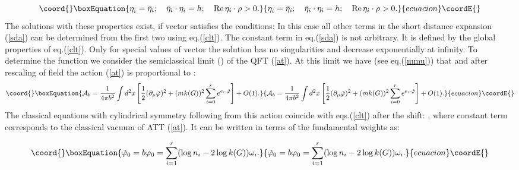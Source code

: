 \documentclass[a4paper,12pt]{article}
\begin{document}
\begin{equation}\coord{}\boxEquation{
\eta _{\bar{i}}=\bar{\eta}_i;\quad \bar{\eta}_i\cdot \eta _i=h;\quad 
\mathop{\rm Re}
\eta _i\cdot \rho >0.  \label{nrml}
}{
\eta _{\bar{i}}=\bar{\eta}_i;\quad \bar{\eta}_i\cdot \eta _i=h;\quad 
\mathop{\rm Re}
\eta _i\cdot \rho >0.  }{ecuacion}\coordE{}\end{equation}
The solutions with these properties exist, if vector \coordHE{} satisfies the
conditions: \coordHE{} In this case all other terms in the
short distance expansion (\ref{sda}) can be determined from the first two
using eq.(\ref{clt}). The constant term \coordHE{} in eq.(\ref{sda}) is not
arbitrary. It is defined by the global properties of eq.(\ref{clt}). Only
for special values of vector \coordHE{} the solution has no singularities and
decrease exponentially at infinity. To determine the function \coordHE{} we
consider the semiclassical limit (\coordHE{}) of the QFT (\ref{at}).
At this limit we have (see eq.(\ref{mmu})) that \coordHE{} and after rescaling of field \coordHE{} the action (\ref{at}) is proportional to \coordHE{}:
\begin{equation}\coord{}\boxEquation{
{\cal A}_b=\frac{1}{4\pi b^2} \int d^2x
\left[ \frac 1{2 }(\partial _\mu\tilde{\varphi} )^2+(mk(G))^2
\sum_{i=0}^re^{e_i\cdot\tilde{ \varphi}}\right]+O(1).
\label{aTTT}
}{
{\cal A}_b=\frac{1}{4\pi b^2} \int d^2x
\left[ \frac 1{2 }(\partial _\mu\tilde{\varphi} )^2+(mk(G))^2
\sum_{i=0}^re^{e_i\cdot\tilde{ \varphi}}\right]+O(1).
}{ecuacion}\coordE{}\end{equation} 
The classical equations
with cylindrical symmetry following from this action 
coincide with eqs.(\ref{clt}) after the shift:
\coordHE{}, where
constant term \coordHE{} corresponds to the classical vacuum of ATT
(\ref{at}). It can be written in terms of the fundamental weights \coordHE{}
as:

\begin{equation}\coord{}\boxEquation{
\tilde{\varphi}_0=b\varphi _0=\sum_{i=1}^r(\log n_i-2\log k(G))\omega _i
\label{clv}.
}{
\tilde{\varphi}_0=b\varphi _0=\sum_{i=1}^r(\log n_i-2\log k(G))\omega _i
.
}{ecuacion}\coordE{}\end{equation}
\end{document}
